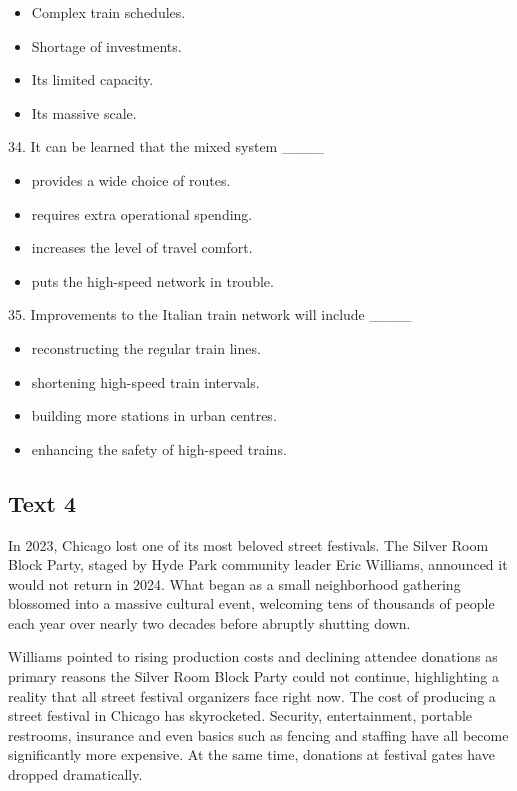 \documentclass[UTF8,11pt]{ctexart}
\begin{document}
\begin{itemize}[leftmargin=2em,itemsep=.2em,topsep=.4em]\item[A.] Complex train schedules.
\item[B.] Shortage of investments.
\item[C.] Its limited capacity.
\item[D.] Its massive scale.
\end{itemize}

34. It can be learned that the mixed system \_\_\_\_


\begin{itemize}[leftmargin=2em,itemsep=.2em,topsep=.4em]\item[A.] provides a wide choice of routes.
\item[B.] requires extra operational spending.
\item[C.] increases the level of travel comfort.
\item[D.] puts the high-speed network in trouble.
\end{itemize}

35. Improvements to the Italian train network will include \_\_\_\_


\begin{itemize}[leftmargin=2em,itemsep=.2em,topsep=.4em]\item[A.] reconstructing the regular train lines.
\item[B.] shortening high-speed train intervals.
\item[C.] building more stations in urban centres.
\item[D.] enhancing the safety of high-speed trains.
\end{itemize}

\subsection*{\textbf{Text 4}}


In 2023, Chicago lost one of its most beloved street festivals. The Silver Room Block Party, staged by Hyde Park community leader Eric Williams, announced it would not return in 2024. What began as a small neighborhood gathering blossomed into a massive cultural event, welcoming tens of thousands of people each year over nearly two decades before abruptly shutting down.


Williams pointed to rising production costs and declining attendee donations as primary reasons the Silver Room Block Party could not continue, highlighting a reality that all street festival organizers face right now. The cost of producing a street festival in Chicago has skyrocketed. Security, entertainment, portable restrooms, insurance and even basics such as fencing and staffing have all become significantly more expensive. At the same time, donations at festival gates have dropped dramatically.
\end{document}

